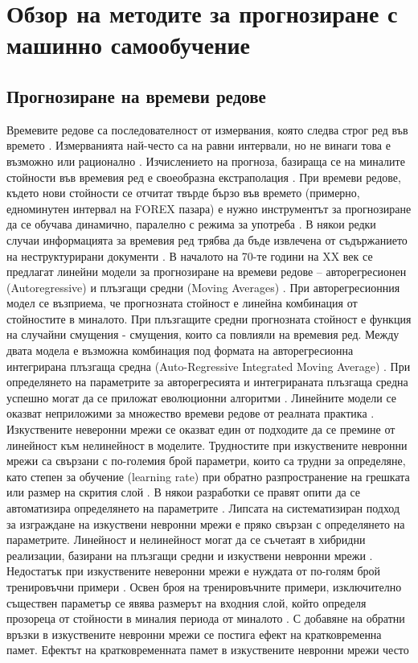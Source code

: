 ﻿\chapter{Обзор на методите за прогнозиране с машинно самообучение}

\section{Прогнозиране на времеви редове}

Времевите редове са последователност от измервания, която следва строг ред във времето \cite{Oliveira-01}. Измерванията най-често са на равни интервали, но не винаги това е възможно или рационално \cite{Shen-01}. Изчислението на прогноза, базираща се на миналите стойности във времевия ред е своеобразна екстраполация \cite{Khashei-03}. При времеви редове, където нови стойности се отчитат твърде бързо във времето (примерно, едноминутен интервал на FOREX пазара) е нужно инструментът за прогнозиране да се обучава динамично, паралелно с режима за употреба \cite{Wagner-01}. В някои редки случаи информацията за времевия ред трябва да бъде извлечена от съдържанието на неструктурирани документи \cite{Wang-01}. В началото на 70-те години на XX век \cite{Gooijer-01} се предлагат линейни модели за прогнозиране на времеви редове – авторегресионен (Autoregressive) и плъзгащи средни (Moving Averages) \cite{Tealab-01}. При авторегресионния модел се възприема, че прогнозната стойност е линейна комбинация от стойностите в миналото. При плъзгащите средни прогнозната стойност е функция на случайни смущения - смущения, които са повлияли на времевия ред. Между двата модела е възможна комбинация под формата на авторегресионна интегрирана плъзгаща средна (Auto-Regressive Integrated Moving Average) \cite{Khashei-01}. При определянето на параметрите за авторегресията и интегрираната плъзгаща средна успешно могат да се приложат еволюционни алгоритми \cite{Cortez-01}. Линейните модели се оказват неприложими за множество времеви редове от реалната практика \cite{Bontempi-01}. Изкуствените неверонни мрежи се оказват един от подходите да се премине от линейност \cite{Zhang-03} към нелинейност в моделите. Трудностите при изкуствените невронни мрежи са свързани с по-големия брой параметри, които са трудни за определяне, като степен за обучение (learning rate) при обратно разпространение на грешката или размер на скрития слой \cite{Tang-01}. В някои разработки се правят опити да се автоматизира определянето на параметрите \cite{Yan-01}. Липсата на систематизиран подход за изграждане на изкуствени невронни мрежи \cite{Qi-01} е пряко свързан с определянето на параметрите. Линейност и нелинейност могат да се съчетаят в хибридни реализации, базирани на плъзгащи средни и изкуствени невронни мрежи \cite{Zhang-01}. Недостатък при изкуствените неверонни мрежи е нуждата от по-голям брой тренировъчни примери \cite{Lachtermacher-01}. Освен броя на тренировъчните примери, изключително съществен параметър се явява размерът на входния слой, който определя прозореца от стойности в миналия периода от миналото \cite{Chen-01}. С добавяне на обратни връзки в изкуствените невронни мрежи се постига ефект на кратковременна памет. Ефектът на кратковременната памет в изкуствените невронни мрежи често 